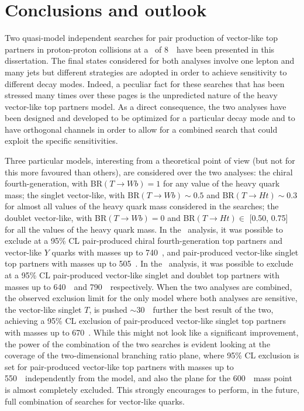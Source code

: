 \clearpage{\pagestyle{empty}\cleardoublepage}

\chapter*{Conclusions and outlook}\label{chap:conclusions}

\vskip-1.5cm

Two quasi-model independent searches for 
pair production of vector-like top partners 
in proton-proton collisions at a \cme\ of 8~\tev\ 
have been presented in this dissertation. The final states considered
for both analyses involve one lepton and many jets but different
strategies are adopted in order to achieve sensitivity to different
decay modes. Indeed, a peculiar fact for these
searches that has been stressed many times over these pages is the 
unpredicted nature of the heavy vector-like top partners model. 
As a direct consequence, the two analyses have been designed
and developed to be optimized for a particular decay mode and
to have orthogonal channels in order to allow
for a combined search that could exploit the specific sensitivities.

Three particular models, interesting from a theoretical point
of view (but not for this more favoured than others), are considered
over the two analyses: the chiral fourth-generation, with 
BR$(T\to Wb)=1$ for any value of the heavy quark mass; 
the singlet vector-like, with BR$(T\to Wb)\sim 0.5$ and 
BR$(T\to Ht)\sim 0.3$ for almost all
values of the heavy quark mass considered in the searches;
the doublet vector-like, with BR$(T\to Wb)= 0$ and 
BR$(T\to Ht)\in$ [0.50, 0.75] for all the values of the heavy quark mass.
In the \wbx\ analysis, it was possible to exclude at a 95\% CL
pair-produced chiral fourth-generation top partners and vector-like
$Y$ quarks with masses up to 740~\gev, and pair-produced vector-like 
singlet top partners with  masses up to 505~\gev.
In the \htx\ analysis, it was possible to exclude at a 95\% CL
pair-produced vector-like singlet and doublet top partners with 
masses up to 640~\gev\ and 790~\gev\ respectively.
When the two analyses are combined, the observed exclusion limit
for the only model where both analyses are sensitive, the
vector-like singlet $T$, is pushed $\sim$30~\gev\ further the
best result of the two, %
achieving a 95\% CL exclusion of pair-produced vector-like singlet 
top partners with masses up to 670~\gev. While this might not
look like a significant improvement, the power of the combination
of the two searches is evident looking at the coverage of the
two-dimensional branching ratio plane, where  95\% CL exclusion is set for
pair-produced vector-like top partners with masses up to 550~\gev\ 
independently from the model, and also the plane for the 600~\gev\ mass
point is almost completely excluded. This strongly encourages to perform,
in the future, full combination of searches for vector-like quarks.


